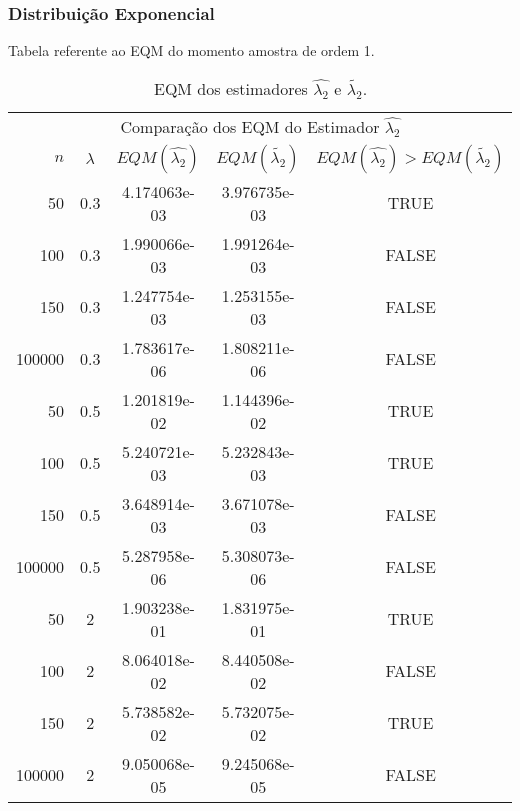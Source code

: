 \begin{frame}
\frametitle{Distribuição Exponencial}
Tabela referente ao EQM do momento amostra de ordem 1.

\begin{table}[H]
\caption{EQM dos estimadores $\hat{\lambda_{2}}$ e $\tilde{\lambda_{2}}$.}
\label{tab:p1EQM}
\tiny
\centering
\begin{tabular}{rcccc}
\toprule
\multicolumn{5}{c}{Comparação dos EQM do Estimador $\hat{\lambda_{2}}$}\\
$n$ & $\lambda$ & $EQM(\hat{\lambda_{2}})$ & $EQM(\tilde{\lambda_{2}})$ & $EQM(\hat{\lambda_{2}})>EQM(\tilde{\lambda_{2}})$ \\
\midrule
50 & 0.3 & 4.174063e-03 & 3.976735e-03  & TRUE \\
100 & 0.3 & 1.990066e-03 & 1.991264e-03 & FALSE \\
150 & 0.3 & 1.247754e-03 & 1.253155e-03 & FALSE \\
100000 & 0.3 & 1.783617e-06 & 1.808211e-06 & FALSE \\
\midrule
50 & 0.5 & 1.201819e-02 & 1.144396e-02  & TRUE \\
100 & 0.5 &  5.240721e-03 & 5.232843e-03 & TRUE \\
150 & 0.5 &  3.648914e-03  & 3.671078e-03 & FALSE\\
100000 & 0.5 & 5.287958e-06 & 5.308073e-06 & FALSE \\
\midrule
50 & 2 & 1.903238e-01 &  1.831975e-01 & TRUE \\
100 & 2 & 8.064018e-02 &  8.440508e-02 & FALSE \\
150 & 2 & 5.738582e-02 & 5.732075e-02 & TRUE \\
100000 & 2 & 9.050068e-05 & 9.245068e-05 & FALSE \\
\bottomrule
\end{tabular}
\end{table}
\end{frame}

